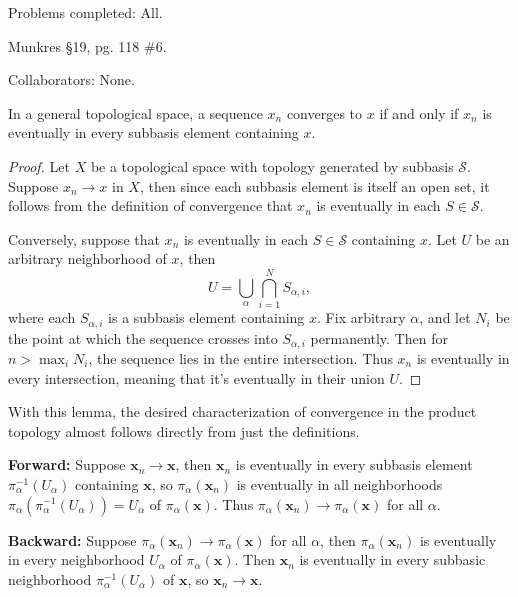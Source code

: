 \documentclass[10pt]{report}
\begin{document}

{\color{blue}Problems completed: All.}

\begin{exer}[]
Munkres \S 19, pg. 118 \#6.
\end{exer}
{\color{blue}Collaborators: None.}

\begin{lem}
	In a general topological space, a sequence $x_n$ converges to $x$ if and only if $x_n$ is eventually in every subbasis element containing $x$.
\end{lem}
\begin{proof}
	Let $X$ be a topological space with topology generated by subbasis $\mathcal{S}$. Suppose $x_n \to x$ in $X$, then since each subbasis element is itself an open set, it follows from the definition of convergence that $x_n$ is eventually in each $S \in \mathcal{S}$.

	Conversely, suppose that $x_n$ is eventually in each $S \in \mathcal{S}$ containing $x$. Let $U$ be an arbitrary neighborhood of $x$, then
	\[
	U = \bigcup_{\alpha} \bigcap_{i=1}^N S_{\alpha,i},
\] where each $S_{\alpha,i}$ is a subbasis element containing $x$. Fix arbitrary $\alpha$, and let $N_i$ be the point at which the sequence crosses into $S_{\alpha,i}$ permanently. Then for $n > \max_i N_i$, the sequence lies in the entire intersection. Thus $x_n$ is eventually in every intersection, meaning that it's eventually in their union $U$.
\end{proof}

With this lemma, the desired characterization of convergence in the product topology almost follows directly from just the definitions.

\textbf{Forward:} Suppose $\mathbf{x}_{n}\to \mathbf{x}$, then $\mathbf{x}_{n}$ is eventually in every subbasis element $\pi_{\alpha}^{-1}(U_{\alpha})$ containing $\mathbf{x}$, so $\pi_{\alpha}(\mathbf{x}_{n})$ is eventually in all neighborhoods $ \pi_{\alpha}(\pi_{\alpha}^{-1}(U_{\alpha})) = U_{\alpha}$ of $\pi_{\alpha}(\mathbf{x})$. Thus $ \pi_{\alpha}(\mathbf{x}_{n})\to \pi_{\alpha}(\mathbf{x})$ for all $\alpha$.

\textbf{Backward:} Suppose $\pi_{\alpha}(\mathbf{x}_{n})\to \pi_{\alpha}(\mathbf{x})$ for all $\alpha$, then $\pi_{\alpha}(\mathbf{x}_{n})$ is eventually in every neighborhood $U_{\alpha}$ of $\pi_{\alpha}(\mathbf{x})$. Then $\mathbf{x}_{n}$ is eventually in every subbasic neighborhood $\pi_{\alpha}^{-1}(U_{\alpha})$ of $\mathbf{x}$, so $\mathbf{x}_{n}\to  \mathbf{x}$.
\end{document}
